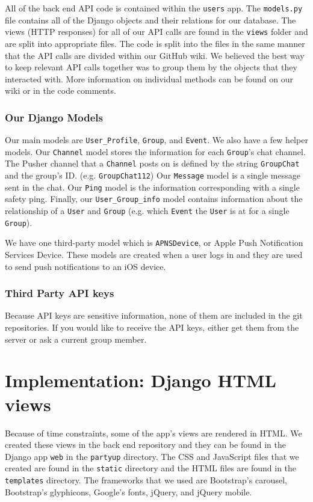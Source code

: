\documentclass[12pt]{article}
\begin{document}
All of the back end API code is contained within the \texttt{users} app.
The \texttt{models.py} file contains all of the Django objects and their relations for our database. 
The views (HTTP responses) for all of our API calls are found in the \texttt{views} folder and are split into appropriate files.
The code is split into the files in the same manner that the API calls are divided within our GitHub wiki. 
We believed the best way to keep relevant API calls together was to group them by the objects that they interacted with. 
More information on individual methods can be found on our wiki or in the code comments.

\subsubsection{Our Django Models}

Our main models are \texttt{User\_Profile}, \texttt{Group}, and \texttt{Event}. 
We also have a few helper models. 
Our \texttt{Channel} model stores the information for each \texttt{Group}'s chat channel. 
The Pusher channel that a \texttt{Channel} posts on is defined by the string \texttt{GroupChat} and the group's ID. (e.g. \texttt{GroupChat112}) 
Our \texttt{Message} model is a single message sent in the chat. 
Our \texttt{Ping} model is the information corresponding with a single safety ping. 
Finally, our \texttt{User\_Group\_info} model contains information about the relationship of a \texttt{User} and \texttt{Group} (e.g. which \texttt{Event} the \texttt{User} is at for a single \texttt{Group}).

We have one third-party model which is \texttt{APNSDevice}, or Apple Push Notification Services Device. 
These models are created when a user logs in and they are used to send push notifications to an iOS device.

\subsubsection{Third Party API keys}

Because API keys are sensitive information, none of them are included in the git repositories. 
If you would like to receive the API keys, either get them from the server or ask a current group member.

\section{Implementation: Django HTML views}

Because of time constraints, some of the app's views are rendered in HTML. We created these views in the back end repository and they can be found in the Django app \texttt{web} in the \texttt{partyup} directory. The CSS and JavaScript files that we created are found in the  \texttt{static} directory and the HTML files are found in the  \texttt{templates} directory. The frameworks that we used are Bootstrap's carousel, Bootstrap's glyphicons, Google's fonts, jQuery, and jQuery mobile. 
\end{document}
